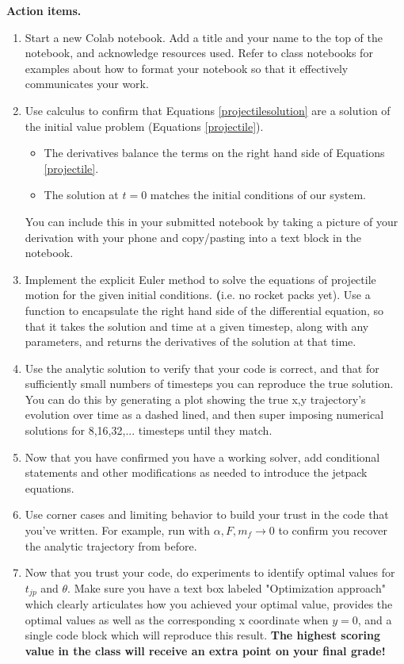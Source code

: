 \documentclass[12pt]{article}
\begin{document}
\noindent \textbf{Action items.}
\begin{enumerate}
    \item Start a new Colab notebook. Add a title and your name to the top of the notebook, and acknowledge resources used. Refer to class notebooks for examples about how to format your notebook so that it effectively communicates your work.
    \item Use calculus to confirm that Equations \ref{projectilesolution} are a solution of the initial value problem (Equations \ref{projectile}).
    \begin{itemize}
        \item The derivatives balance the terms on the right hand side of Equations \ref{projectile}.
        \item The solution at $t=0$ matches the initial conditions of our system.
    \end{itemize}
    You can include this in your submitted notebook by taking a picture of your derivation with your phone and copy/pasting into a text block in the notebook.

    \item Implement the explicit Euler method to solve the equations of projectile motion for the given initial conditions. \textbf(i.e. no rocket packs yet). Use a function to encapsulate the right hand side of the differential equation, so that it takes the solution and time at a given timestep, along with any parameters, and returns the derivatives of the solution at that time.

    \item Use the analytic solution to verify that your code is correct, and that for sufficiently small numbers of timesteps you can reproduce the true solution. You can do this by generating a plot showing the true x,y trajectory's evolution over time as a dashed lined, and then super imposing numerical solutions for 8,16,32,... timesteps until they match.

    \item Now that you have confirmed you have a working solver, add conditional statements and other modifications as needed to introduce the jetpack equations. 

    \item Use corner cases and limiting behavior to build your trust in the code that you've written. For example, run with $\alpha,F,m_f \rightarrow 0$ to confirm you recover the analytic trajectory from before.

    \item Now that you trust your code, do experiments to identify optimal values for $t_{jp}$ and $\theta$. Make sure you have a text box labeled "Optimization approach" which clearly articulates how you achieved your optimal value, provides the optimal values as well as the corresponding x coordinate when $y=0$, and a single code block which will reproduce this result. \textbf{The highest scoring value in the class will receive an extra point on your final grade!}
    

\end{enumerate}
\end{document}
